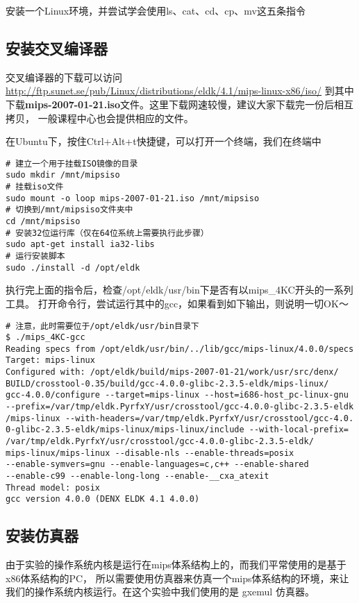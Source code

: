 \begin{exercise}
安装一个Linux环境，并尝试学会使用ls、cat、cd、cp、mv这五条指令
\end{exercise}

\subsection{安装交叉编译器}
交叉编译器的下载可以访问\url{http://ftp.sunet.se/pub/Linux/distributions/eldk/4.1/mips-linux-x86/iso/}
到其中下载\textbf{mips-2007-01-21.iso}文件。这里下载网速较慢，建议大家下载完一份后相互拷贝，
一般课程中心也会提供相应的文件。

在Ubuntu下，按住Ctrl+Alt+t快捷键，可以打开一个终端，我们在终端中

\begin{verbatim}
# 建立一个用于挂载ISO镜像的目录
sudo mkdir /mnt/mipsiso
# 挂载iso文件
sudo mount -o loop mips-2007-01-21.iso /mnt/mipsiso
# 切换到/mnt/mipsiso文件夹中
cd /mnt/mipsiso
# 安装32位运行库（仅在64位系统上需要执行此步骤）
sudo apt-get install ia32-libs
# 运行安装脚本
sudo ./install -d /opt/eldk
\end{verbatim}

执行完上面的指令后，检查/opt/eldk/usr/bin下是否有以mips\_4KC开头的一系列工具。
打开命令行，尝试运行其中的gcc，如果看到如下输出，则说明一切OK～

\begin{verbatim}
# 注意，此时需要位于/opt/eldk/usr/bin目录下
$ ./mips_4KC-gcc
Reading specs from /opt/eldk/usr/bin/../lib/gcc/mips-linux/4.0.0/specs
Target: mips-linux
Configured with: /opt/eldk/build/mips-2007-01-21/work/usr/src/denx/
BUILD/crosstool-0.35/build/gcc-4.0.0-glibc-2.3.5-eldk/mips-linux/
gcc-4.0.0/configure --target=mips-linux --host=i686-host_pc-linux-gnu 
--prefix=/var/tmp/eldk.PyrfxY/usr/crosstool/gcc-4.0.0-glibc-2.3.5-eldk
/mips-linux --with-headers=/var/tmp/eldk.PyrfxY/usr/crosstool/gcc-4.0.
0-glibc-2.3.5-eldk/mips-linux/mips-linux/include --with-local-prefix=
/var/tmp/eldk.PyrfxY/usr/crosstool/gcc-4.0.0-glibc-2.3.5-eldk/
mips-linux/mips-linux --disable-nls --enable-threads=posix 
--enable-symvers=gnu --enable-languages=c,c++ --enable-shared 
--enable-c99 --enable-long-long --enable-__cxa_atexit
Thread model: posix
gcc version 4.0.0 (DENX ELDK 4.1 4.0.0)
\end{verbatim}

\subsection{安装仿真器}
由于实验的操作系统内核是运行在mips体系结构上的，而我们平常使用的是基于x86体系结构的PC，
所以需要使用仿真器来仿真一个mips体系结构的环境，来让我们的操作系统内核运行。在这个实验中我们使用的是 gxemul 仿真器。

